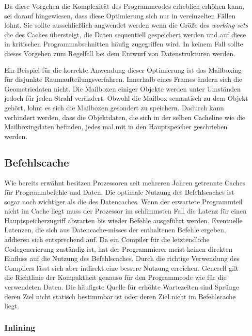 Da diese Vorgehen die Komplexität des Programmcodes erheblich erhöhen kann, sei darauf hingewiesen, dass diese Optimierung sich nur in vereinzelten Fällen lohnt. Sie sollte ausschließlich angwendet werden wenn die Größe des \textit{working sets} die des Caches übersteigt, die Daten sequentiell gespeichert werden und auf diese in kritischen Programmabschnitten häufig zugegriffen wird. In keinem Fall sollte dieses Vorgehen zum Regelfall bei dem Entwurf von Datenstrukturen werden.

Ein Beispiel für die korrekte Anwendung dieser Optimierung ist das Mailboxing für disjunkte Raumaufteilungsverfahren. 
Innerhalb eines Frames ändern sich die Geometriedaten nicht. Die Mailboxen einiger Objekte werden unter Umständen jedoch für jeden Strahl verändert. Obwohl die Mailbox semantisch zu dem Objekt gehört, lohnt es sich die Mailboxen gesondert zu speichern. Dadurch kann verhindert werden, dass die Objektdaten, die sich in der selben Cacheline wie die Mailboxingdaten befinden, jedes mal mit in den Hauptspeicher geschrieben werden.

\subsection{Befehlscache}

Wie bereits erwähnt besitzen Prozessoren seit mehreren Jahren getrennte Caches für Programmbefehle und Daten. Die optimale Nutzung des Befehlscaches ist sogar noch wichtiger als die des Datencaches. Wenn der erwartete Programmteil nicht im Cache liegt muss der Prozessor im schlimmsten Fall die Latenz für einen Hauptspeicherzugriff abwarten bis wieder Befehle ausgeführt werden. Eventuelle Latenzen, die sich aus Datencache-misses der enthaltenen Befehle ergeben, addieren sich entsprechend auf.
Da ein Compiler für die letztendliche Codegenerierung zuständig ist, hat der Programmierer meist keinen direkten Einfluss auf die Nutzung des Befehlscaches. Durch die richtige Verwendung des Compilers lässt sich aber indirekt eine bessere Nutzung erreichen.
Generell gilt die Richtlinie der Kompaktheit genauso für den Programmcode wie für die verwendeten Daten.
Die häufigste Quelle für erhöhte Wartezeiten sind Sprünge deren Ziel nicht statisch bestimmbar ist oder deren Ziel
nicht im Befehlscache liegt.

\subsubsection{Inlining}

